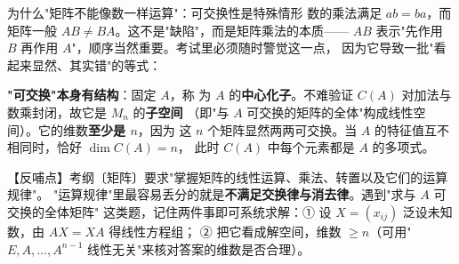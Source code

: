 \begin{fdeep}{为什么"矩阵不能像数一样运算"：可交换性是特殊情形}
数的乘法满足 $ab=ba$，而矩阵一般 $AB\ne BA$。这不是"缺陷"，而是矩阵乘法的本质——
$AB$ 表示"先作用 $B$ 再作用 $A$"，顺序当然重要。考试里必须随时警觉这一点，
因为它导致一批"看起来显然、其实错"的等式：

\medskip
\textbf{"可交换"本身有结构}：固定 $A$，称
为 $A$ 的\textbf{中心化子}。不难验证 $C(A)$ 对加法与数乘封闭，故它是 $M_n$ 的\textbf{子空间}
（即"与 $A$ 可交换的矩阵的全体"构成线性空间）。它的维数\textbf{至少是 $n$}，因为
这 $n$ 个矩阵显然两两可交换。当 $A$ 的特征值互不相同时，恰好 $\dim C(A)=n$，
此时 $C(A)$ 中每个元素都是 $A$ 的多项式。

【反哺点】考纲〔矩阵〕要求"掌握矩阵的线性运算、乘法、转置以及它们的运算规律"。
"运算规律"里最容易丢分的就是\textbf{不满足交换律与消去律}。遇到"求与 $A$ 可交换的全体矩阵"
这类题，记住两件事即可系统求解：① 设 $X=(x_{ij})$ 泛设未知数，由 $AX=XA$ 得线性方程组；
② 把它看成解空间，维数 $\ge n$（可用"$E,A,\dots,A^{n-1}$ 线性无关"来核对答案的维数是否合理）。
\end{fdeep}

